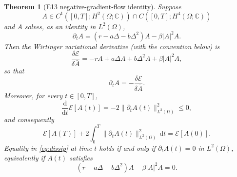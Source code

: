 \documentclass[11pt]{article}
\newtheorem{theorem}{Theorem}
\newcommand{\Om}{\Omega}
\newcommand{\E}{\mathcal E}
\newcommand{\dd}{\mathrm d}
\begin{document}
\begin{theorem}[E13 negative-gradient-flow identity]\label{thm:e13}
Suppose
\begin{equation}\label{eq:regularity}
 A\in C^1([0,T];H^2(\Om;\mathbb C))\cap
       C([0,T];H^4(\Om;\mathbb C))
\end{equation}
and $A$ solves, as an identity in $L^2(\Om)$,
\begin{equation}\label{eq:e13}
 \partial_t A=(r-a\Delta-b\Delta^2)A-\beta|A|^2A.
\end{equation}
Then the Wirtinger variational derivative (with the convention below) is
\begin{equation}\label{eq:wirtinger}
 \frac{\delta\E}{\delta\overline A}
   =-rA+a\Delta A+b\Delta^2 A+\beta|A|^2A,
\end{equation}
so that
\begin{equation}\label{eq:negative}
 \partial_t A=-\frac{\delta\E}{\delta\overline A}.
\end{equation}
Moreover, for every $t\in[0,T]$,
\begin{equation}\label{eq:dissip}
 \frac{\dd}{\dd t}\E[A(t)]
      =-2\|\partial_t A(t)\|_{L^2(\Om)}^2\leq0,
\end{equation}
and consequently
\begin{equation}\label{eq:balance}
 \E[A(T)]+2\int_0^T\|\partial_t A(t)\|_{L^2(\Om)}^2\,\dd t
       =\E[A(0)].
\end{equation}
Equality in \eqref{eq:dissip} at time $t$ holds if and only if
$\partial_t A(t)=0$ in $L^2(\Om)$, equivalently if $A(t)$ satisfies
\begin{equation}\label{eq:stationary}
 (r-a\Delta-b\Delta^2)A-\beta|A|^2A=0.
\end{equation}
\end{theorem}
\end{document}
